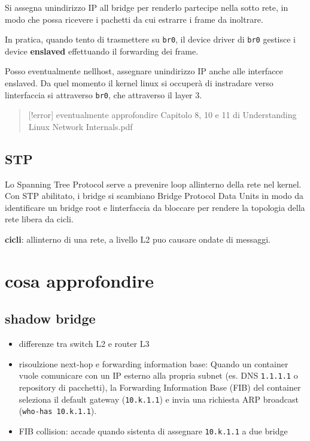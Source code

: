Si assegna un\textquotesingle indirizzo IP all bridge per renderlo
partecipe nella sotto rete, in modo che possa ricevere i pachetti da cui
estrarre i frame da inoltrare.

In pratica, quando tento di trasmettere su
\passthrough{\lstinline!br0!}, il device driver di
\passthrough{\lstinline!br0!} gestisce i device \textbf{enslaved}
effettuando il forwarding dei frame.

Posso eventualmente nell\textquotesingle host, assegnare
un\textquotesingle indirizzo IP anche alle interfacce enslaved. Da quel
momento il kernel linux si occuperà di instradare verso
l\textquotesingle interfaccia si attraverso
\passthrough{\lstinline!br0!}, che attraverso il layer 3.

\begin{quote}
{[}!error{]} eventualmente approfondire Capitolo 8, 10 e 11 di
Understanding Linux Network Internals.pdf
\end{quote}

\subsection{STP}\label{stp}

Lo Spanning Tree Protocol serve a prevenire loop
all\textquotesingle interno della rete nel kernel. Con STP abilitato, i
bridge si scambiano Bridge Protocol Data Units in modo da identificare
un bridge root e l\textquotesingle interfaccia da bloccare per rendere
la topologia della rete libera da cicli.

\textbf{cicli}: all\textquotesingle interno di una rete, a livello L2
puo\textquotesingle{} causare ondate di messaggi.

\section{cosa approfondire}\label{cosa-approfondire}

\subsection{shadow bridge}\label{shadow-bridge}

\begin{itemize}
\tightlist
\item
  differenze tra switch L2 e router L3
\item
  risoulzione next-hop e forwarding information base: Quando un
  container vuole comunicare con un IP esterno alla propria subnet (es.
  DNS \passthrough{\lstinline!1.1.1.1!} o repository di pacchetti), la
  Forwarding Information Base (FIB) del container seleziona il default
  gateway (\passthrough{\lstinline!10.k.1.1!}) e invia una richiesta ARP
  broadcast (\passthrough{\lstinline!who-has 10.k.1.1!}).
\item
  FIB collision: accade quando sistenta di assegnare
  \passthrough{\lstinline!10.k.1.1!} a due bridge
\end{itemize}


